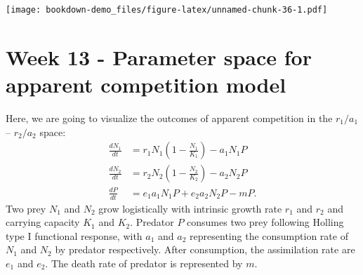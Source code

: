 \documentclass[
]{book}
\begin{document}
\texttt{[image: bookdown-demo\_files/figure-latex/unnamed-chunk-36-1.pdf]}

\hypertarget{week-13---parameter-space-for-apparent-competition-model}{%
\chapter*{Week 13 - Parameter space for apparent competition model}\label{week-13---parameter-space-for-apparent-competition-model}}

Here, we are going to visualize the outcomes of apparent competition in the \(r_1/a_1\) -- \(r_2/a_2\) space:
\begin{align*}
\frac{dN_1}{dt} &= r_1N_1(1-\frac{N_1}{K_1}) - a_1N_1P\\
\frac{dN_2}{dt} &= r_2N_2(1-\frac{N_2}{K_2}) - a_2N_2P\\
\frac{dP}{dt} &= e_1a_1N_1P + e_2a_2N_2P - mP.
\end{align*}
Two prey \(N_1\) and \(N_2\) grow logistically with intrinsic growth rate \(r_1\) and \(r_2\) and carrying capacity \(K_1\) and \(K_2\). Predator \(P\) consumes two prey following Holling type I functional response, with \(a_1\) and \(a_2\) representing the consumption rate of \(N_1\) and \(N_2\) by predator respectively. After consumption, the assimilation rate are \(e_1\) and \(e_2\). The death rate of predator is represented by \(m\).
\end{document}
